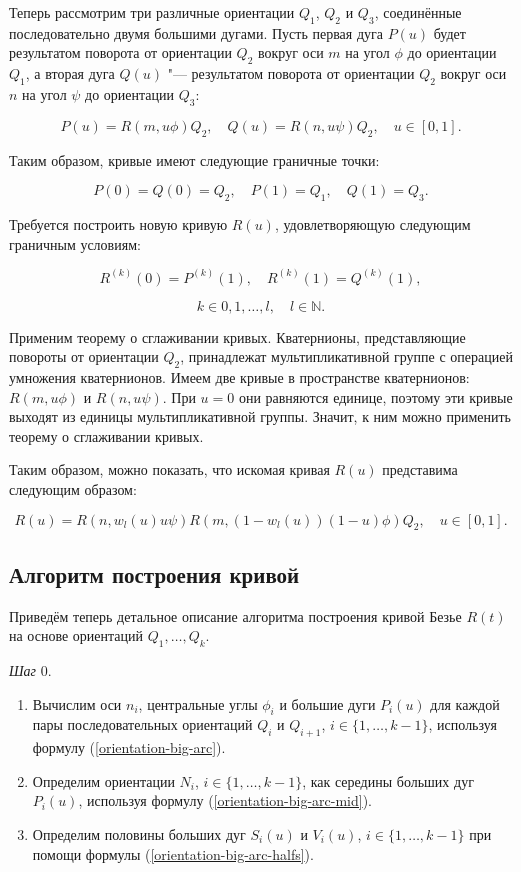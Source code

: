 Теперь рассмотрим три различные ориентации $Q_1$, $Q_2$ и $Q_3$, соединённые последовательно двумя большими
дугами. Пусть первая дуга $P(u)$ будет результатом поворота от ориентации $Q_2$ вокруг оси $m$ на угол $\phi$ до
ориентации $Q_1$, а вторая дуга $Q(u)$ "--- результатом поворота от ориентации $Q_2$ вокруг оси $n$ на угол $\psi$ до
ориентации $Q_3$:

$$
P(u)=R(m,u\phi)Q_2, \quad Q(u)=R(n,u\psi)Q_2, \quad u \in [0,1].
$$

Таким образом, кривые имеют следующие граничные точки:

$$
P(0)=Q(0)=Q_2, \quad P(1)=Q_1, \quad Q(1)=Q_3.
$$

Требуется построить новую кривую $R(u)$, удовлетворяющую следующим граничным условиям:

$$
R^{(k)}(0)=P^{(k)}(1), \quad R^{(k)}(1)=Q^{(k)}(1),
$$

$$
k \in {0,1,\dots,l}, \quad l \in \mathbb{N}.
$$

Применим теорему о сглаживании кривых. Кватернионы, представляющие повороты от ориентации $Q_2$, принадлежат
мультипликативной группе с операцией умножения кватернионов. Имеем две кривые в пространстве кватернионов:
$R(m,u\phi)$ и $R(n,u\psi)$. При $u=0$ они равняются единице, поэтому эти кривые выходят из единицы мультипликативной
группы. Значит, к ним можно применить теорему о сглаживании кривых.

Таким образом, можно показать, что искомая кривая $R(u)$ представима следующим образом:

$$
R(u)=R(n,w_l(u)u\psi)R(m,(1-w_l(u))(1-u)\phi)Q_2, \quad u \in [0,1].
$$

\subsection*{Алгоритм построения кривой}

Приведём теперь детальное описание алгоритма построения кривой Безье $R(t)$ на основе ориентаций $Q_1,\dots,Q_k$.

\bigskip
\textit{Шаг} 0.

\begin{enumerate}
\item Вычислим оси $n_i$, центральные углы $\phi_i$ и большие дуги $P_i(u)$ для каждой пары последовательных ориентаций
$Q_i$ и $Q_{i+1}$, $i \in \{1,\dots,k-1\}$, используя формулу (\ref{orientation-big-arc}).
\item Определим ориентации $N_i$, $i \in \{1,\dots,k-1\}$, как середины больших дуг $P_i(u)$, используя формулу
(\ref{orientation-big-arc-mid}).
\item Определим половины больших дуг $S_i(u)$ и $V_i(u)$, $i \in \{1,\dots,k-1\}$ при помощи формулы
(\ref{orientation-big-arc-halfs}).
\end{enumerate}

